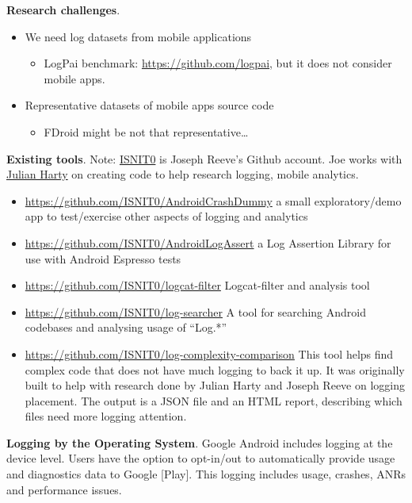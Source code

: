 \documentclass[a4paper]{article}
\newcommand{\smallsection}[1]{\noindent \textbf{#1}. }
\begin{document}
\smallsection{Research challenges}

\begin{itemize}
\tightlist
\item
  We need log datasets from mobile applications
    \begin{itemize}
  \tightlist
\item
  LogPai benchmark: \url{https://github.com/logpai}, but it does not
  consider mobile apps.
\end{itemize}

\item
  Representative datasets of mobile apps source code

    \begin{itemize}
  \tightlist
\item
  FDroid might be not that representative\ldots{}
\end{itemize}
\end{itemize}

\smallsection{Existing tools}
Note: \href{https://github.com/ISNIT0}{ISNIT0} is Joseph Reeve's Github
account. Joe works with \href{https://github.com/julianharty}{Julian
Harty} on creating code to help research logging, mobile analytics.

\begin{itemize}
\tightlist
\item
  \url{https://github.com/ISNIT0/AndroidCrashDummy} a small
  exploratory/demo app to test/exercise other aspects of logging and
  analytics
\item
  \url{https://github.com/ISNIT0/AndroidLogAssert} a Log Assertion
  Library for use with Android Espresso tests
\item
  \url{https://github.com/ISNIT0/logcat-filter} Logcat-filter and
  analysis tool
\item
  \url{https://github.com/ISNIT0/log-searcher} A tool for searching
  Android codebases and analysing usage of ``Log.*''
\item
  \url{https://github.com/ISNIT0/log-complexity-comparison} This tool
  helps find complex code that does not have much logging to back it up.
  It was originally built to help with research done by Julian Harty and
  Joseph Reeve on logging placement. The output is a JSON file and an
  HTML report, describing which files need more logging attention.
\end{itemize}

\smallsection{Logging by the Operating System}
Google Android includes logging at the device level. Users have the
option to opt-in/out to automatically provide usage and diagnostics data
to Google {[}Play{]}. This logging includes usage, crashes, ANRs and
performance issues.
\end{document}
